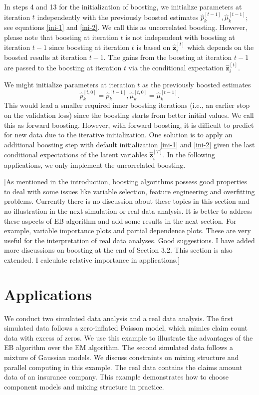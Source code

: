 \documentclass[11pt]{article}
\numberwithin{equation}{section}
\def\bz{\boldsymbol{z}}
\begin{document}
In steps 4 and 13 for the initialization of boosting, 
we initialize parameters at iteration $t$ {independently} with the previously boosted estimates $\hat{p}_k^{[t-1]}, \hat{\mu}_k^{[t-1]}$; 
	see equations \eqref{ini-1} and \eqref{ini-2}. 
	We call this as uncorrelated boosting.
	However, please note that boosting at iteration $t$ is not independent with boosting at iteration $t-1$ 
since boosting at iteration $t$ is based on $\hat{\bz}_i^{[t]}$ which depends on the boosted results at iteration $t-1$. 
The gains from the boosting at iteration $t-1$ are passed to  the boosting at iteration $t$ via the conditional expectation $\hat{\bz}_i^{[t]}$. 
	
	We might initialize parameters at iteration $t$ as the previously boosted estimates $$\hat{p}_k^{[t,0]}=\hat{p}_k^{[t-1]}, \hat{\mu}_k^{[t,0]}=\hat{\mu}_k^{[t-1]}.$$
This would lead a {smaller} required inner boosting iterations (i.e., an {earlier} stop on the validation loss) since the boosting starts from better initial values.
	We call this as forward boosting. 
	However, with forward boosting, it is difficult to predict for new data due to the {iterative initialization}. 
	One solution is to apply an additional boosting step with default initialization \eqref{ini-1} and \eqref{ini-2} given the {last conditional expectations of the latent variables $\hat{\bz}^{[T]}_i$}. 
	In the following applications, we only implement the uncorrelated boosting.

{\color{blue}[As mentioned in the introduction, boosting algorithms possess good properties to deal with some issues like variable selection, feature engineering and overfitting problems. Currently there is no discussion about these topics in this section and no illustration in the next simulation or real data analysis. It is better to address these aspects of EB algorithm and add some results in the next section. For example, variable importance plots and partial dependence plots. These are very useful for the interpretation of real data analyses. Good suggestions. I have added more discussions on boosting at the end of Section 3.2. This section is also extended. I calculate relative importance in applications.]}

	
\section{Applications}\label{sec:application}

We conduct two simulated data analysis and a real data analysis. 
The first simulated data follows a zero-inflated Poisson model, which mimics claim count data with excess of zeros.
We use this example to illustrate the advantages of the EB algorithm over the EM algorithm.
The second simulated data follows a mixture of Gaussian models. 
We discuss constraints on mixing structure and parallel computing in this example.
The real data contains the claims amount data of an insurance company. 
This example demonstrates how to choose component models and mixing structure in practice.
\end{document}
